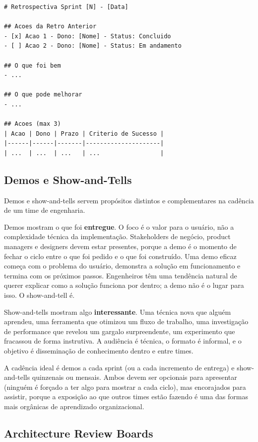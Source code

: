 \begin{lstlisting}[language={}, caption={Template de Ação de Retrospectiva}]
# Retrospectiva Sprint [N] - [Data]

## Acoes da Retro Anterior
- [x] Acao 1 - Dono: [Nome] - Status: Concluido
- [ ] Acao 2 - Dono: [Nome] - Status: Em andamento

## O que foi bem
- ...

## O que pode melhorar
- ...

## Acoes (max 3)
| Acao | Dono | Prazo | Criterio de Sucesso |
|------|------|-------|---------------------|
| ...  | ...  | ...   | ...                 |
\end{lstlisting}

\subsection{Demos e Show-and-Tells}

Demos e show-and-tells servem propósitos distintos e complementares na
cadência de um time de engenharia.

Demos mostram o que foi \textbf{entregue}. O foco é o valor para o usuário,
não a complexidade técnica da implementação. Stakeholders de negócio,
product managers e designers devem estar presentes, porque a demo é o
momento de fechar o ciclo entre o que foi pedido e o que foi construído.
Uma demo eficaz começa com o problema do usuário, demonstra a solução em
funcionamento e termina com os próximos passos. Engenheiros têm uma
tendência natural de querer explicar como a solução funciona por dentro;
a demo não é o lugar para isso. O show-and-tell é.

Show-and-tells mostram algo \textbf{interessante}. Uma técnica nova que
alguém aprendeu, uma ferramenta que otimizou um fluxo de trabalho, uma
investigação de performance que revelou um gargalo surpreendente, um
experimento que fracassou de forma instrutiva. A audiência é técnica, o
formato é informal, e o objetivo é disseminação de conhecimento dentro e
entre times.

A cadência ideal é demos a cada sprint (ou a cada incremento de entrega) e
show-and-tells quinzenais ou mensais. Ambos devem ser opcionais para
apresentar (ninguém é forçado a ter algo para mostrar a cada ciclo),
mas encorajados para assistir, porque a exposição ao que outros times estão
fazendo é uma das formas mais orgânicas de aprendizado organizacional.

\subsection{Architecture Review Boards}

